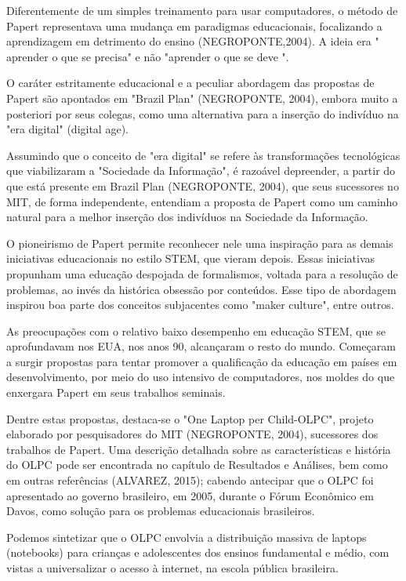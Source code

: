Diferentemente de um simples treinamento para usar computadores, o método de Papert representava uma mudança em paradigmas educacionais, focalizando a aprendizagem em detrimento do ensino  (NEGROPONTE,2004). A ideia era " aprender o que se precisa" e não "aprender o que se deve ".

O caráter estritamente educacional e a peculiar abordagem das propostas de Papert são apontados em "Brazil Plan" (NEGROPONTE, 2004), embora muito a posteriori por seus colegas, como uma alternativa para a inserção do indivíduo na "era digital" (digital age).

Assumindo que o conceito de "era digital" se refere às transformações tecnológicas que viabilizaram a "Sociedade da Informação",  é razoável depreender, a partir do que está presente em Brazil Plan  (NEGROPONTE, 2004), que seus sucessores no MIT, de forma independente, entendiam a proposta de Papert como um caminho natural para a melhor inserção dos indivíduos na Sociedade da Informação.

O pioneirismo de Papert permite reconhecer nele uma inspiração para as demais iniciativas educacionais no estilo STEM, que vieram depois. Essas iniciativas propunham uma educação despojada de formalismos, voltada para a resolução de problemas, ao invés da histórica obsessão por conteúdos. Esse tipo de abordagem inspirou boa parte dos conceitos subjacentes como "maker culture", entre outros.

As preocupações com o relativo baixo desempenho em  educação STEM, que se aprofundavam nos EUA, nos anos 90, alcançaram o resto do mundo. Começaram a surgir propostas para tentar promover a qualificação da educação em países em desenvolvimento, por meio do uso intensivo de computadores, nos moldes do que enxergara Papert em seus trabalhos seminais.

Dentre estas propostas, destaca-se o "One Laptop per Child-OLPC", projeto elaborado por pesquisadores do MIT  (NEGROPONTE, 2004), sucessores dos trabalhos de Papert. Uma descrição detalhada sobre as características e história do OLPC pode ser encontrada no capítulo de Resultados e Análises, bem como em outras referências (ALVAREZ, 2015); cabendo antecipar que o OLPC foi apresentado ao governo brasileiro, em 2005, durante o Fórum Econômico em Davos, como solução para os problemas educacionais brasileiros.

Podemos sintetizar que o OLPC envolvia a distribuição massiva de laptops (notebooks) para crianças e adolescentes dos ensinos fundamental e médio, com vistas a universalizar o acesso à internet, na escola pública brasileira.

